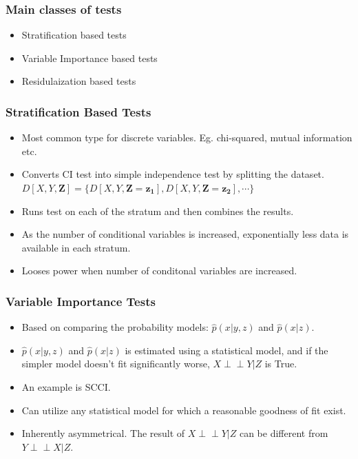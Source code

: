 \documentclass{beamer}
\def\ci{\perp\!\!\!\!\!\perp}
\begin{document}
\begin{frame}
	\frametitle{Main classes of tests}
	\begin{itemize}
		\setlength\itemsep{1em}
		\item Stratification based tests
		\item Variable Importance based tests
		\item Residulaization based tests
	\end{itemize}
\end{frame}

\begin{frame}
	\frametitle{Stratification Based Tests}
	\begin{itemize}
		\setlength\itemsep{1em}
		\item Most common type for discrete variables. Eg. chi-squared,
			mutual information etc. 
		\item Converts CI test into simple independence test by splitting 
			the dataset.
		$ D[X, Y, \bm{Z}] = \{ D[X, Y, \bm{Z}=\bm{z_1}], D[X, Y, \bm{Z}=\bm{z_2}], \cdots \} $	
		\item Runs test on each of the stratum and then combines the results.
		\item As the number of conditional variables is increased, exponentially
			less data is available in each stratum.
		\item Looses power when number of conditonal variables
			are increased.
	\end{itemize}
\end{frame}

\begin{frame}
	\frametitle{Variable Importance Tests}
	\begin{itemize}
		\setlength\itemsep{1em}
		\item Based on comparing the probability models: $\hat{p}(x | y, z) $ 
			and $ \hat{p}(x | z) $.
		\item $ \hat{p}(x|y, z) $ and $ \hat{p}(x | z) $ is estimated using a
			statistical model, and if the simpler model doesn't fit
			significantly worse, $ X \ci Y | Z $ is True.
		\item An example is SCCI.
		\item Can utilize any statistical model for which a reasonable goodness
			of fit exist.
		\item Inherently asymmetrical. The result of $ X \ci Y | Z $
			can be different from $ Y \ci X | Z $.
	\end{itemize}

\end{frame}
\end{document}

